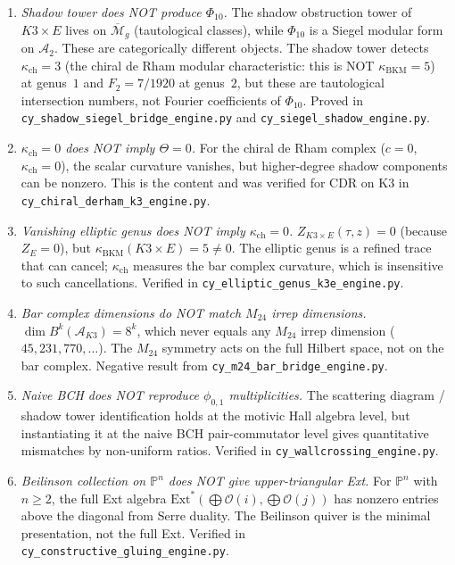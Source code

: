 \documentclass[11pt]{article}
\newcommand{\cA}{\mathcal{A}}
\newcommand{\cM}{\mathcal{M}}
\newcommand{\cO}{\mathcal{O}}
\newcommand{\bP}{\mathbb{P}}
\begin{document}
\begin{enumerate}
 \item \emph{Shadow tower does NOT produce $\Phi_{10}$.} The shadow obstruction tower of $K3 \times E$ lives on $\overline{\cM}_g$ (tautological classes), while $\Phi_{10}$ is a Siegel modular form on $\cA_2$. These are categorically different objects. The shadow tower detects $\kappa_{\mathrm{ch}} = 3$ (the chiral de Rham modular characteristic: this is NOT $\kappa_{\mathrm{BKM}} = 5$) at genus~$1$ and $F_2 = 7/1920$ at genus~$2$, but these are tautological intersection numbers, not Fourier coefficients of $\Phi_{10}$. Proved in \texttt{cy\_shadow\_siegel\_bridge\_engine.py} and \texttt{cy\_siegel\_shadow\_engine.py}.

 \item \emph{$\kappa_{\mathrm{ch}} = 0$ does NOT imply $\Theta = 0$.} For the chiral de Rham complex ($c = 0$, $\kappa_{\mathrm{ch}} = 0$), the scalar curvature vanishes, but higher-degree shadow components can be nonzero. This is the content and was verified for CDR on K3 in \texttt{cy\_chiral\_derham\_k3\_engine.py}.

 \item \emph{Vanishing elliptic genus does NOT imply $\kappa_{\mathrm{ch}} = 0$.} $Z_{K3 \times E}(\tau,z) = 0$ (because $Z_E = 0$), but $\kappa_{\mathrm{BKM}}(K3 \times E) = 5 \neq 0$. The elliptic genus is a refined trace that can cancel; $\kappa_{\mathrm{ch}}$ measures the bar complex curvature, which is insensitive to such cancellations. Verified in \texttt{cy\_elliptic\_genus\_k3e\_engine.py}.

 \item \emph{Bar complex dimensions do NOT match $M_{24}$ irrep dimensions.} $\dim B^k(\cA_{K3}) = 8^k$, which never equals any $M_{24}$ irrep dimension ($45, 231, 770, \ldots$). The $M_{24}$ symmetry acts on the full Hilbert space, not on the bar complex. Negative result from \texttt{cy\_m24\_bar\_bridge\_engine.py}.

 \item \emph{Naive BCH does NOT reproduce $\phi_{0,1}$ multiplicities.} The scattering diagram / shadow tower identification holds at the motivic Hall algebra level, but instantiating it at the naive BCH pair-commutator level gives quantitative mismatches by non-uniform ratios. Verified in \texttt{cy\_wallcrossing\_engine.py}.

 \item \emph{Beilinson collection on $\bP^n$ does NOT give upper-triangular Ext.} For $\bP^n$ with $n \geq 2$, the full Ext algebra $\mathrm{Ext}^*(\bigoplus \cO(i), \bigoplus \cO(j))$ has nonzero entries above the diagonal from Serre duality. The Beilinson quiver is the minimal presentation, not the full Ext. Verified in \texttt{cy\_constructive\_gluing\_engine.py}.
\end{enumerate}
\end{document}
